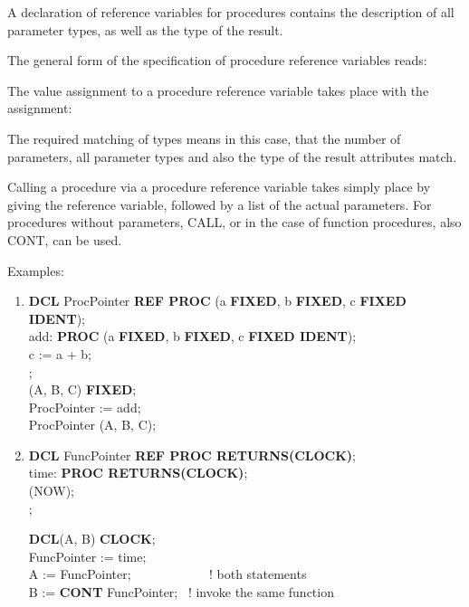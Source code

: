 A declaration of reference variables for procedures contains the
description of all parameter types, as well as the type of the result.


 

The general form of the specification of procedure reference variables
reads:

 

The value assignment to a procedure reference variable takes place with
the assignment:




The required matching of types means in this case, that the number of
parameters, all parameter types and also the type of the result
attributes match.

Calling a procedure via a procedure reference variable takes simply
place by giving the reference variable, followed by a list of the actual
parameters. For procedures without parameters, CALL, or in the case of
function procedures, also CONT, can be used.

Examples:
\begin{enumerate}
\item {\bf DCL} ProcPointer {\bf REF PROC} (a {\bf FIXED}, b {\bf FIXED}, c {\bf FIXED IDENT});\\
      add: {\bf PROC} (a {\bf FIXED}, b {\bf FIXED}, c {\bf FIXED IDENT});\\
      \x   c := a + b;\\
      ;\\
       (A, B, C) {\bf FIXED};\\
      ProcPointer := add;\\
      ProcPointer (A, B, C);
\item {\bf DCL} FuncPointer {\bf REF PROC RETURNS(CLOCK)};\\
      time: {\bf PROC RETURNS(CLOCK)};\\
      (NOW);\\
      ;

      {\bf DCL}(A, B) {\bf CLOCK};\\
      FuncPointer := time;\\
      A := FuncPointer; ~~~~~~~~~~~ ! both statements\\
      B := {\bf CONT} FuncPointer;~ ! invoke the same function
\end{enumerate}

